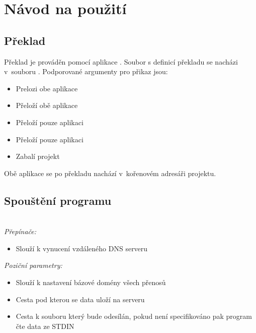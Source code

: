 
\section{Návod na použití} \label{sec:usage}

\subsection{Překlad}\label{section:compilation}

Překlad je prováděn pomocí aplikace .
Soubor s definicí překladu se nacházi v~souboru .
Podporované argumenty pro přikaz  jsou:

\begin{itemize}
    \item {} Prelozi obe aplikace
    \item {} Přeloží obě aplikace
    \item {} Přeloží pouze aplikaci 
    \item {} Přeloží pouze aplikaci 
    \item {} Zabalí projekt
\end{itemize}

Obě aplikace se po překladu nachází v~kořenovém adresáři projektu.

\subsection{Spouštění programu }

 \\

\textit{Přepínače:}

\begin{itemize}
    \item {} Slouží k vynucení vzdáleného DNS serveru
\end{itemize}

\textit{Poziční parametry:}

\begin{itemize}
    \item {} Slouží k nastavení bázové domény všech přenosů
    \item {} Cesta pod kterou se data uloží na serveru
    \item {} Cesta k souboru který bude odesílán, pokud není specifikováno pak program čte data ze STDIN
\end{itemize}

